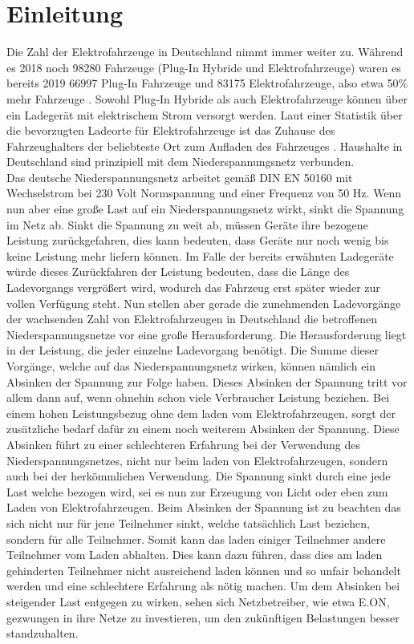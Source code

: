 \chapter{Einleitung}

Die Zahl der Elektrofahrzeuge in Deutschland nimmt immer weiter zu. Während es 2018 noch 98280 Fahrzeuge (Plug-In Hybride und Elektrofahrzeuge) waren es bereits 2019 66997 Plug-In Fahrzeuge und 83175 Elektrofahrzeuge, also etwa 50\% mehr Fahrzeuge \cite{intro_stat_1}. Sowohl Plug-In Hybride als auch Elektrofahrzeuge können über ein Ladegerät mit elektrischem Strom versorgt werden. Laut einer Statistik über die bevorzugten Ladeorte für Elektrofahrzeuge ist das Zuhause des Fahrzeughalters der beliebteste Ort zum Aufladen des Fahrzeuges \cite{intro_stat_2}. Haushalte in Deutschland sind prinzipiell mit dem Niederspannungsnetz verbunden. \\
Das deutsche Niederspannungsnetz arbeitet gemäß DIN EN 50160 mit Wechselstrom bei 230 Volt Normspannung und einer Frequenz von 50 Hz. Wenn nun aber eine große Last auf ein Niederspannungsnetz wirkt, sinkt die Spannung im Netz ab. Sinkt die Spannung zu weit ab, müssen Geräte ihre bezogene Leistung zurückgefahren, dies kann bedeuten, dass Geräte nur noch wenig bis keine Leistung mehr liefern können. Im Falle der bereits erwähnten Ladegeräte würde dieses Zurückfahren der Leistung bedeuten, dass die Länge des Ladevorgangs vergrößert wird, wodurch das Fahrzeug erst später wieder zur vollen Verfügung steht. Nun stellen aber gerade die zunehmenden Ladevorgänge der wachsenden Zahl von Elektrofahrzeugen in Deutschland die betroffenen Niederspannungsnetze vor eine große Herausforderung. Die Herausforderung liegt in der Leistung, die jeder einzelne Ladevorgang benötigt. Die Summe dieser Vorgänge, welche auf das Niederspannungsnetz wirken, können nämlich ein Absinken der Spannung zur Folge haben. Dieses Absinken der Spannung tritt vor allem dann auf, wenn ohnehin schon viele Verbraucher Leistung beziehen. Bei einem hohen Leistungsbezug ohne dem laden vom Elektrofahrzeugen, sorgt der zusätzliche bedarf dafür zu einem noch weiterem Absinken der Spannung. Diese Absinken führt zu einer schlechteren Erfahrung bei der Verwendung des Niederspannungsnetzes, nicht nur beim laden von Elektrofahrzeugen, sondern auch bei der herkömmlichen Verwendung. Die Spannung sinkt durch eine jede Last welche bezogen wird, sei es nun zur Erzeugung von Licht oder eben zum Laden von Elektrofahrzeugen. Beim Absinken der Spannung ist zu beachten das sich nicht nur für jene Teilnehmer sinkt, welche tatsächlich Last beziehen, sondern für alle Teilnehmer. Somit kann das laden einiger Teilnehmer andere Teilnehmer vom Laden abhalten. Dies kann dazu führen, dass dies am laden gehinderten Teilnehmer nicht ausreichend laden können und so unfair behandelt werden und eine schlechtere Erfahrung als nötig machen. Um dem Absinken bei steigender Last entgegen zu wirken, sehen sich Netzbetreiber, wie etwa E.ON, gezwungen in ihre Netze zu investieren, um den zukünftigen Belastungen besser standzuhalten. \\
